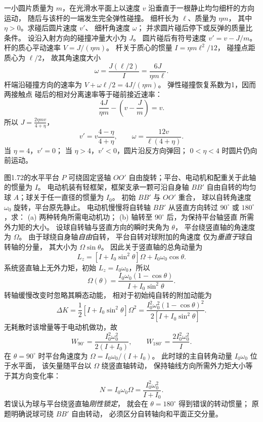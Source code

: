 一小圆片质量为 $m$，在光滑水平面上以速度 $v$
沿垂直于一根静止均匀细杆的方向运动，
随后与该杆的一端发生完全弹性碰撞。
细杆长为 $\ell$、质量为 $\eta m$，
其中 $\eta>0$。求碰后圆片速度 $v'$、
细杆角速度 $\omega$；
并求圆片碰后停下或反弹的质量比条件。
\exsolution
设沿入射方向的碰撞冲量大小为 $J$。
圆片碰后有符号速度
$v'=v-J/m$。
杆的质心平动速率
$V=J/(\eta m)$。
杆关于质心的惯量
$I=\eta m\ell^2/12$，
碰撞点距质心为 $\ell/2$，
故其角速度大小
\[
\omega=\frac{J(\ell/2)}{I}
=\frac{6J}{\eta m\ell}.
\]
杆端沿碰撞方向的速率为
$V+\omega\ell/2=4J/(\eta m)$。
弹性碰撞恢复系数为1，因而两接触点
碰后的相对分离速率等于碰前接近速率：
\[
\frac{4J}{\eta m}-\left(v-\frac Jm\right)=v.
\]
所以 $J=\frac{2\eta m v}{4+\eta}$，
\[
\boxed{v'=v\frac{4-\eta}{4+\eta}},
\qquad
\boxed{\omega=\frac{12v}{\ell(4+\eta)}}.
\]
\excheck 当 $\eta=4$，$v'=0$；
当 $\eta>4$，$v'<0$，圆片沿反方向弹回；
$0<\eta<4$ 时圆片仍向前运动。

图1.72的水平平台 $P$ 可绕固定竖轴 $OO'$
自由旋转；平台、电动机和配重关于此轴的惯量为 $I$。
电动机装有轻框架，框架支承一颗可沿自身轴 $BB'$
自由自转的均匀球 $A$；球关于任一直径的惯量为 $I_0$。
初始 $BB'$ 与 $OO'$ 重合，
球以自转角速度 $\omega_0$ 旋转，平台原先静止。
电动机慢慢将自转轴 $BB'$ 从竖直方向转过
$90^\circ$ 或 $180^\circ$，求：
(a) 两种转角所需电动机功；
(b) 轴转至 $90^\circ$ 后，为保持平台轴竖直
所需外力矩的大小。
\exsolution
设球自转轴与竖直方向的瞬时夹角为 $\theta$，
平台绕竖直轴的角速度为 $\Omega$。
由于球绕自身轴\emph{自由}自转，
平台自转对球附加的角速度
仅为\emph{垂直于}球自转轴的分量，
其大小为 $\Omega\sin\theta$。
因此关于竖直轴的总角动量为
\[
L_z=[I+I_0\sin^2\theta]\Omega
+I_0\omega_0\cos\theta.
\]
系统竖直轴上无外力矩，初始
$L_z=I_0\omega_0$，所以
\[
\Omega(\theta)=
\frac{I_0\omega_0(1-\cos\theta)}
{I+I_0\sin^2\theta}.
\]
转轴缓慢改变时忽略其瞬态动能，
相对于初始纯自转的附加动能为
\[
\Delta K=\frac12[I+I_0\sin^2\theta]\Omega^2
=\frac{I_0^2\omega_0^2(1-\cos\theta)^2}
{2[I+I_0\sin^2\theta]}.
\]
无耗散时该增量等于电动机做功，故
\[
\boxed{W_{90^\circ}=
\frac{I_0^2\omega_0^2}{2(I+I_0)}},\qquad
\boxed{W_{180^\circ}=\frac{2I_0^2\omega_0^2}{I}}.
\]
在 $\theta=90^\circ$ 时平台角速度为
$\Omega=I_0\omega_0/(I+I_0)$。
此时球的主自转角动量
$I_0\omega_0$ 位于水平面，
该矢量随平台以 $\Omega$ 绕竖直轴转动，
保持轴线方向所需外力矩大小等于其方向变化率：
\[
\boxed{N=I_0\omega_0\Omega
=\frac{I_0^2\omega_0^2}{I+I_0}}.
\]
\excheck 若误认为球与平台绕竖直轴\emph{刚性锁定}，
就会在 $\theta=180^\circ$ 得到错误的转动惯量；
原题明确说球可绕 $BB'$ 自由转动，
必须区分自转轴向和平面正交分量。

